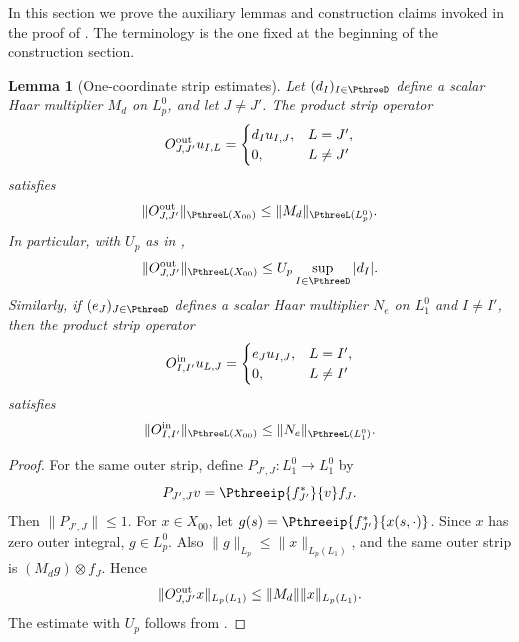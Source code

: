 \documentclass[11pt,reqno]{amsart}
\makeatletter
\theoremstyle{plain}
\newtheorem{lemma}[lemma]{Lemma}
\theoremstyle{definition}
\newcounter{problempaper}
\newenvironment{problempaperbody}{%
  \setcounter{subsection}{0}%
  \setcounter{subsubsection}{0}%
  \setcounter{paragraph}{0}%
  \renewcommand{\thesubsection}{\arabic{subsection}}%
  \renewcommand{\thesubsubsection}{\thesubsection.\arabic{subsubsection}}%
  \renewcommand{\theparagraph}{\thesubsubsection.\arabic{paragraph}}%
  \let\problem@outersection\section
  \let\problem@outersubsection\subsection
  \let\problem@outersubsubsection\subsubsection
  \let\problem@outerparagraph\paragraph
  \let\section\problem@papersection
  \let\subsection\problem@papersubsection
  \let\subsubsection\problem@papersubsubsection
}{%
  \let\section\problem@outersection
  \let\subsection\problem@outersubsection
  \let\subsubsection\problem@outersubsubsection
  \let\paragraph\problem@outerparagraph
}
\newcommand{\problem@target}[2]{%
  \hypertarget{problem-\theproblempaper-#1-#2}{}%
}
\newcommand{\problem@paperheading}[3]{%
  \par\bigskip
  \problem@target{#1}{#2}%
  \noindent{\large\bfseries #2.\quad #3\par}%
  \nobreak\smallskip
}
\newcommand{\problem@papersubheading}[3]{%
  \par\medskip
  \problem@target{#1}{#2}%
  \noindent{\normalsize\bfseries #2.\quad #3\par}%
  \nobreak\smallskip
}
\newcommand{\problem@papersubsubheading}[3]{%
  \par\smallskip
  \problem@target{#1}{#2}%
  \noindent{\normalsize\itshape #2.\quad #3.\ }%
}
\def\problem@papersection{%
  \@ifstar{\problem@papersectionstar}{\problem@papersectionnostar}%
}
\def\problem@papersectionstar#1{%
  \par\bigskip\noindent{\large\bfseries #1\par}\nobreak\smallskip
}
\def\problem@papersectionnostar#1{%
  \refstepcounter{subsection}%
  \setcounter{subsubsection}{0}%
  \setcounter{paragraph}{0}%
  \problem@paperheading{section}{\thesubsection}{#1}%
  \problem@writecontentsline{section}{\thesubsection}{#1}%
}
\def\problem@papersubsection{%
  \@ifstar{\problem@papersubsectionstar}{\problem@papersubsectionnostar}%
}
\def\problem@papersubsectionstar#1{%
  \par\medskip\noindent{\normalsize\bfseries #1\par}\nobreak\smallskip
}
\def\problem@papersubsectionnostar#1{%
  \refstepcounter{subsubsection}%
  \setcounter{paragraph}{0}%
  \problem@papersubheading{subsection}{\thesubsubsection}{#1}%
  \problem@writecontentsline{subsection}{\thesubsubsection}{#1}%
}
\def\problem@papersubsubsection{%
  \@ifstar{\problem@papersubsubsectionstar}{\problem@papersubsubsectionnostar}%
}
\def\problem@papersubsubsectionstar#1{%
  \par\smallskip\noindent{\normalsize\itshape #1.\ }%
}
\def\problem@papersubsubsectionnostar#1{%
  \refstepcounter{paragraph}%
  \problem@papersubsubheading{subsubsection}{\theparagraph}{#1}%
  \problem@writecontentsline{subsubsection}{\theparagraph}{#1}%
}
\newcommand{\problem@writecontentsline}[3]{%
  \begingroup
  \protected@write\@auxout{}{%
    \string\problemcontentsentry{\theproblempaper}{#1}{#2}{#3}{\thepage}%
  }%
  \endgroup
}
\newcommand{\problemcontentsentry}[5]{%
  \@ifundefined{problemcontents@#1}{%
    \expandafter\gdef\csname problemcontents@#1\endcsname{}%
  }{}%
  \expandafter\g@addto@macro\csname problemcontents@#1\endcsname{%
    \problemcontentsline{#1}{#2}{#3}{#4}{#5}%
  }%
}
\newcommand{\problemcontentslink}[4]{%
  \hyperlink{problem-#1-#2-#3}{#4}%
}
\newcommand{\problemcontentsline}[5]{%
  \ifstrequal{#2}{section}{%
    \par\noindent
    \problemcontentslink{#1}{#2}{#3}{\makebox[2.5em][l]{#3}#4}%
    \nobreak\dotfill
    \problemcontentslink{#1}{#2}{#3}{#5}\par
  }{%
    \ifstrequal{#2}{subsection}{%
      \par\noindent\hspace*{1.5em}%
      \problemcontentslink{#1}{#2}{#3}{\makebox[3.5em][l]{#3}#4}%
      \nobreak\dotfill
      \problemcontentslink{#1}{#2}{#3}{#5}\par
    }{%
      \par\noindent\hspace*{3em}%
      \problemcontentslink{#1}{#2}{#3}{\makebox[4.5em][l]{#3}#4}%
      \nobreak\dotfill
      \problemcontentslink{#1}{#2}{#3}{#5}\par
    }%
  }%
}
\makeatother
\begin{document}
\begin{problempaperbody}
In this section we prove the auxiliary lemmas and construction claims invoked in the proof of . The terminology is the one fixed at the beginning of the construction section.

\begin{lemma}[One-coordinate strip estimates]
\label{p3:lem:one-coordinate-strip-estimates}
Let $(d_I)_{I\in\PthreeD}$ define a scalar Haar multiplier $M_d$ on $L_p^0$, and let $J\ne J'$. The product strip operator
\begin{equation*}
        O_{J,J'}^{\rm out}u_{I,L}=\begin{cases} d_Iu_{I,J},&L=J',\\ 0,&L\ne J' \end{cases}
\end{equation*}
satisfies
\begin{equation*}
        \|O_{J,J'}^{\rm out}\|_{\PthreeL(X_{00})}\leq \|M_d\|_{\PthreeL(L_p^0)}.
\end{equation*}
In particular, with $U_p$ as in ,
\begin{equation*}
        \|O_{J,J'}^{\rm out}\|_{\PthreeL(X_{00})}\leq U_p\sup_{I\in\PthreeD}|d_I|.
\end{equation*}
Similarly, if $(e_J)_{J\in\PthreeD}$ defines a scalar Haar multiplier $N_e$ on $L_1^0$ and $I\ne I'$, then the product strip operator
\begin{equation*}
        O_{I,I'}^{\rm in}u_{L,J}=\begin{cases} e_Ju_{I,J},&L=I',\\ 0,&L\ne I' \end{cases}
\end{equation*}
satisfies
\begin{equation*}
        \|O_{I,I'}^{\rm in}\|_{\PthreeL(X_{00})}\leq \|N_e\|_{\PthreeL(L_1^0)}.
\end{equation*}
\end{lemma}

\begin{proof}
For the same outer strip, define $P_{J',J}\colon L_1^0\to L_1^0$ by
\begin{equation*}
        P_{J',J}v=\Pthreeip{f_{J'}^*}{v}f_J.
\end{equation*}
Then $\|P_{J',J}\|\leq1$. For $x\in X_{00}$, let $g(s)=\Pthreeip{f_{J'}^*}{x(s,\cdot)}$. Since $x$ has zero outer integral, $g\in L_p^0$. Also $\|g\|_{L_p}\leq\|x\|_{L_p(L_1)}$, and the same outer strip is $(M_dg)\otimes f_J$. Hence
\begin{equation*}
        \|O_{J,J'}^{\rm out}x\|_{L_p(L_1)}\leq\|M_d\|\|x\|_{L_p(L_1)}.
\end{equation*}
The estimate with $U_p$ follows from .


\end{proof}
\end{problempaperbody}
\end{document}
